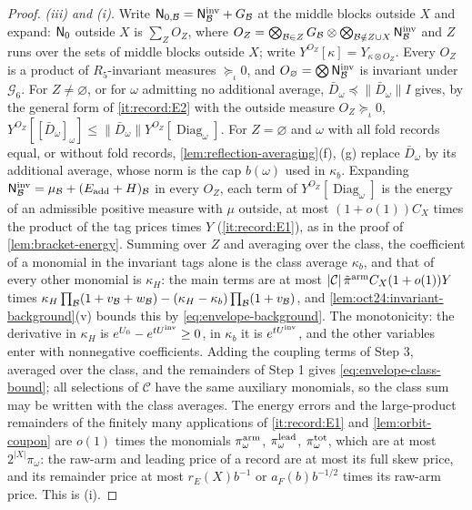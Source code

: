 \begin{proof}
\emph{(iii) and (i).} Write $\mathsf N_{0,\mathcal B}=\mathsf N^{\rm inv}_\mathcal B+G_\mathcal B$ at the middle blocks
outside $X$ and expand: $\mathsf N_0$ outside $X$ is $\sum_ZO_Z$, where
$O_Z=\bigotimes_{\mathcal B\in Z}G_\mathcal B\otimes\bigotimes_{\mathcal B\notin Z\cup X}\mathsf N^{\rm inv}_\mathcal B$ and $Z$ runs
over the sets of middle blocks outside $X$; write $Y^{O_Z}[\kappa]=Y_{\kappa\otimes O_Z}$.
Every $O_Z$ is a product of $R_5$-invariant measures $\succeq_\iota0$, and
$O_\varnothing=\bigotimes\mathsf N^{\rm inv}_\mathcal B$ is invariant under $\mathcal G_6$. For $Z\ne\varnothing$,
or for $\omega$ admitting no additional average, $\bar D_\omega\preceq\|\bar D_\omega\|I$ gives, by
the general form of \ref{it:record:E2} with the outside measure $O_Z\succeq_\iota0$,
$Y^{O_Z}[[\bar D_\omega]_\omega]\le\|\bar D_\omega\|Y^{O_Z}[\operatorname{Diag}_\omega]$. For $Z=\varnothing$
and $\omega$ with all fold records equal, or without fold records,
\cref{lem:reflection-averaging}(f), (g) replace $\bar D_\omega$ by its additional average,
whose norm is the cap $b(\omega)$ used in $\kappa_b$. Expanding
$\mathsf N^{\rm inv}_\mathcal B=\mu_\mathcal B+(E_{\rm add}+H)_\mathcal B$ in every $O_Z$, each term of
$Y^{O_Z}[\operatorname{Diag}_\omega]$ is the energy of an admissible positive measure with $\mu$
outside, at most $(1+o(1))C_X$ times the product of the tag prices times $Y$
(\ref{it:record:E1}), as in the proof of \cref{lem:bracket-energy}. Summing over $Z$
and averaging over the class, the coefficient of a monomial in the invariant tags
alone is the class average $\kappa_b$, and that of every other monomial is $\kappa_H$:
the main terms are at most $|\mathcal C|\,\tilde\pi^{\rm arm}C_X(1+o(1))Y$ times
$\kappa_H\prod_\mathcal B(1+v_\mathcal B+w_\mathcal B)-(\kappa_H-\kappa_b)\prod_\mathcal B(1+v_\mathcal B)$, and
\cref{lem:oct24:invariant-background}(v) bounds this by \eqref{eq:envelope-background}.
The monotonicity: the derivative in $\kappa_H$ is $e^{U_0}-e^{tU^{\mathrm{inv}}}\ge0$, in $\kappa_b$
it is $e^{tU^{\mathrm{inv}}}$, and the other variables enter with nonnegative coefficients.
Adding the coupling terms of Step 3, averaged over the class, and the remainders of
Step 1 gives \eqref{eq:envelope-class-bound}; all selections of $\mathcal C$ have the same
auxiliary monomials, so the class sum may be written with the class averages. The
energy errors and the large-product remainders of the finitely many applications
of \ref{it:record:E1} and \cref{lem:orbit-coupon} are $o(1)$ times the monomials
$\pi^{\rm arm}_\omega$, $\pi^{\rm lead}_\omega$, $\pi^{\rm tot}_\omega$, which are at most $2^{|X|}\pi_\omega$:
the raw-arm and leading price of a record are at most its full skew price, and its
remainder price at most $r_E(X)b^{-1}$ or $a_F(b)b^{-1/2}$ times its raw-arm price. This
is (i).


\end{proof}
